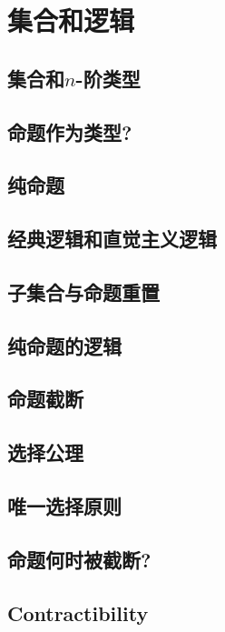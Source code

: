 \chapter{集合和逻辑}
\label{cha:logic}


\section{集合和\texorpdfstring{$n$}{n}-阶类型}
\label{sec:basics-sets}


\section{命题作为类型?}
\label{subsec:pat?}


\section{纯命题}
\label{subsec:hprops}


\section{经典逻辑和直觉主义逻辑}
\label{sec:intuitionism}


\section{子集合与命题重置}
\label{subsec:prop-subsets}


\section{纯命题的逻辑}
\label{subsec:logic-hprop}


\section{命题截断}
\label{subsec:prop-trunc}


\section{选择公理}
\label{sec:axiom-choice}


\section{唯一选择原则}
\label{sec:unique-choice}


\section{命题何时被截断?}
\label{subsec:when-trunc}


\section{Contractibility}
\label{sec:contractibility}


\sectionNotes


\sectionExercises

